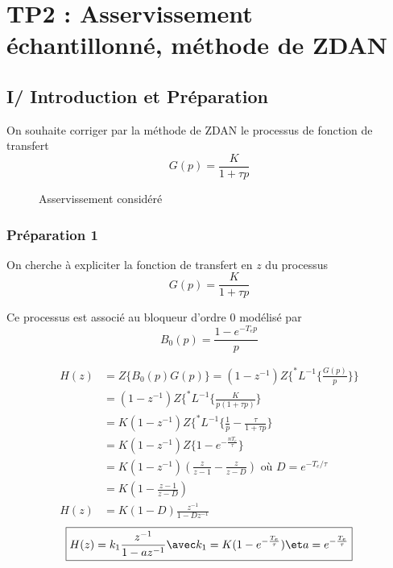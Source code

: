 \documentclass[../../Cours_M1.tex]{subfiles}
\newcommand{\nomTD}{TP2 : Asservissement échantillonné, méthode de ZDAN}
\newcommand{\z}{z^{-1}}
\begin{document}
\section*{\nomTD}

\subsection*{I/ Introduction et Préparation}

On souhaite corriger par la méthode de ZDAN le processus de fonction de transfert \[G(p) = \frac{K}{1+\tau p}\]

\begin{figure}[h!]
\centering
{}
\caption{Asservissement considéré}
\end{figure}

\subsubsection*{Préparation 1}

On cherche à expliciter la fonction de transfert en $z$ du processus \[G(p) = \frac{K}{1+\tau p}\]

Ce processus est associé au bloqueur d'ordre 0 modélisé par \[B_0(p) = \frac{1-e^{-T_ep}}{p}\]

\begin{align*}
H(z) & = Z\{B_0(p)G(p)\} = (1-\z)Z\{^*L^{-1}\{\frac{G(p)}{p}\}\} \\
& = (1-\z)Z\{^*L^{-1}\{ \frac{K}{p(1+\tau p)} \} \\
& = K (1-\z)Z\{^*L^{-1}\{ \frac{1}{p} - \frac{\tau}{1+\tau p} \} \\
& = K (1-\z)Z\{1-e^{-\frac{nT_e}{\tau}}\} \\
& = K (1-\z)(\frac{z}{z-1}-\frac{z}{z-D}) \text{ où } D = e^{-T_e/\tau} \\
& = K(1-\frac{z-1}{z-D}) \\
H(z) & = K(1-D)\frac{\z}{1-D\z}
\end{align*}
\[ \boxed{H(z) = k_1\frac{\z}{1-a\z} \avec k_1 = K(1-e^{-\frac{T_e}{\tau}}) \et a = e^{-\frac{T_e}{\tau}}} \]
\end{document}
